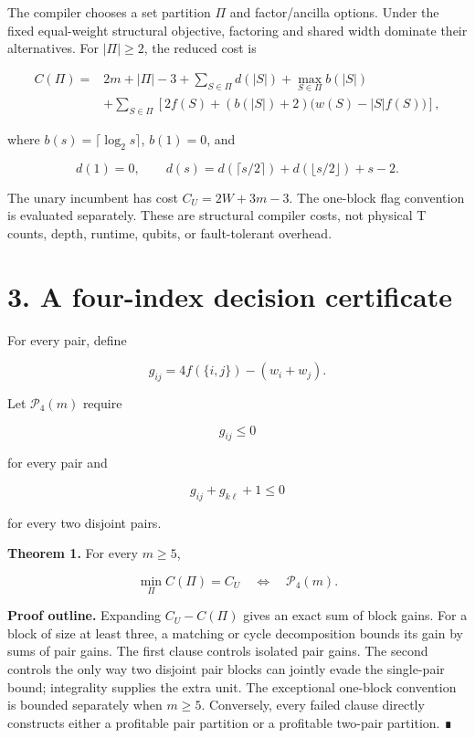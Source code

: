 \documentclass[
  11pt,
]{article}
\begin{document}
The compiler chooses a set partition \(\Pi\) and factor/ancilla options.
Under the fixed equal-weight structural objective, factoring and shared
width dominate their alternatives. For \(|\Pi|\ge2\), the reduced cost
is

\[
\begin{aligned}
C(\Pi)={}&2m+|\Pi|-3+\sum_{S\in\Pi}d(|S|)
+\max_{S\in\Pi}b(|S|)\\
&+\sum_{S\in\Pi}\left[2f(S)+(b(|S|)+2)
\bigl(w(S)-|S|f(S)\bigr)\right],
\end{aligned}
\]

where \(b(s)=\lceil\log_2s\rceil\), \(b(1)=0\), and

\[
d(1)=0, \qquad
d(s)=d(\lceil s/2\rceil)+d(\lfloor s/2\rfloor)+s-2.
\]

The unary incumbent has cost \(C_U=2W+3m-3\). The one-block flag
convention is evaluated separately. These are structural compiler costs,
not physical T counts, depth, runtime, qubits, or fault-tolerant
overhead.

\hypertarget{a-four-index-decision-certificate}{%
\section{3. A four-index decision
certificate}\label{a-four-index-decision-certificate}}

For every pair, define

\[
g_{ij}=4f(\{i, j\})-(w_i+w_j).
\]

Let \(\mathcal P_4(m)\) require

\[
g_{ij}\le0
\]

for every pair and

\[
g_{ij}+g_{k\ell}+1\le0
\]

for every two disjoint pairs.

\textbf{Theorem 1.} For every \(m\ge5\),

\[
\min_\Pi C(\Pi)=C_U
\quad\Longleftrightarrow\quad
\mathcal P_4(m).
\]

\textbf{Proof outline.} Expanding \(C_U-C(\Pi)\) gives an exact sum of
block gains. For a block of size at least three, a matching or cycle
decomposition bounds its gain by sums of pair gains. The first clause
controls isolated pair gains. The second controls the only way two
disjoint pair blocks can jointly evade the single-pair bound;
integrality supplies the extra unit. The exceptional one-block
convention is bounded separately when \(m\ge5\). Conversely, every
failed clause directly constructs either a profitable pair partition or
a profitable two-pair partition. ∎
\end{document}
